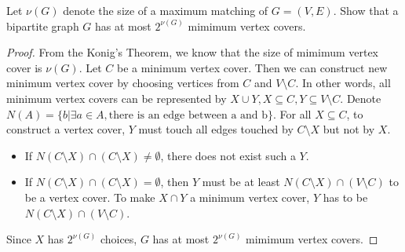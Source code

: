 



    \maketitle
    \begin{thm}{}{}
        Let $\nu(G)$ denote the size of a maximum matching of $G=(V,E)$.
        Show that a bipartite graph $G$ has at most $2^{\nu(G)}$ mimimum vertex covers.
    \end{thm}
    \begin{proof}
        From the Konig's Theorem, we know that the size of mimimum vertex cover is $\nu(G)$.
        Let $C$ be a minimum vertex cover.
        Then we can construct new minimum vertex cover by choosing vertices from $C$ and $V\setminus C$.
        In other words, all minimum vertex covers can be represented by $X\cup Y, X\subseteq C,Y\subseteq V\setminus C$.
        Denote $N(A)=\{b|\exists a\in A, \text{there is an edge between a and b}\}$.
        For all $X\subseteq C$, to construct a vertex cover, $Y$ must touch all edges touched by $C\setminus X$ but not by $X$.
        \begin{itemize}
            \item If $N(C\setminus X)\cap (C\setminus X)\ne \emptyset$, there does not exist such a $Y$.
            \item  If $N(C\setminus X)\cap (C\setminus X)= \emptyset$, then $Y$ must be at least $N(C\setminus X) \cap (V\setminus C)$ to be a vertex cover.
            To make $X\cap Y$ a minimum vertex cover, $Y$ has to be $N(C\setminus X) \cap (V\setminus C)$.
        \end{itemize}

        Since $X$ has $2^{\nu(G)}$ choices, $G$ has at most $2^{\nu(G)}$ mimimum vertex covers.
    \end{proof}

